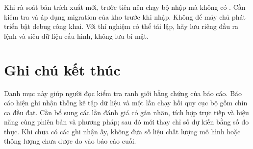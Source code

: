 Khi rà soát bản trích xuất mới, trước tiên nên chạy bộ nhập mà không có . Cần kiểm tra và áp dụng migration của kho trước khi nhập. Không để máy chủ phát triển bật debug công khai. Với thí nghiệm có thể tái lập, hãy lưu riêng đầu ra lệnh và siêu dữ liệu cấu hình, không lưu bí mật.

\section{Ghi chú kết thúc}

Danh mục này giúp người đọc kiểm tra ranh giới bằng chứng của báo cáo. Báo cáo hiện ghi nhận thống kê tập dữ liệu và một lần chạy hồi quy cục bộ gồm chín ca đều đạt. Cần bổ sung các lần đánh giá có gán nhãn, tích hợp trực tiếp và hiệu năng cùng phiên bản và phương pháp; sau đó mới thay chỉ số dự kiến bằng số đo thực. Khi chưa có các ghi nhận ấy, không đưa số liệu chất lượng mô hình hoặc thông lượng chưa được đo vào báo cáo cuối.
